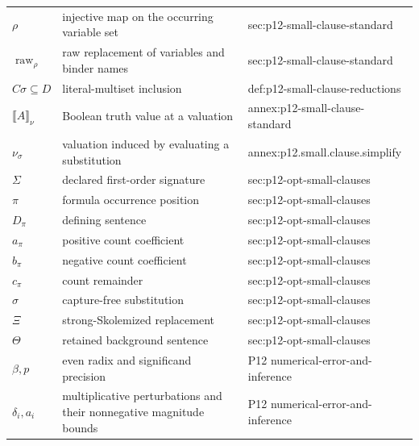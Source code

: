 \begin{longtable}{@{}p{}p{}p{}@{}}
\(\rho\) & injective map on the occurring variable set & sec:\allowbreak{}p12-\allowbreak{}small-\allowbreak{}clause-\allowbreak{}standard \\
\(\operatorname{raw}_\rho\) & raw replacement of variables and binder names & sec:\allowbreak{}p12-\allowbreak{}small-\allowbreak{}clause-\allowbreak{}standard \\
\(C\sigma\subseteq D\) & literal-multiset inclusion & def:\allowbreak{}p12-\allowbreak{}small-\allowbreak{}clause-\allowbreak{}reductions \\
\(\llbracket A\rrbracket_\nu\) & Boolean truth value at a valuation & annex:\allowbreak{}p12-\allowbreak{}small-\allowbreak{}clause-\allowbreak{}standard \\
\(\nu_\sigma\) & valuation induced by evaluating a substitution & annex:\allowbreak{}p12.\allowbreak{}small.\allowbreak{}clause.\allowbreak{}simplify \\
\(\Sigma\) & declared first-order signature & sec:\allowbreak{}p12-\allowbreak{}opt-\allowbreak{}small-\allowbreak{}clauses \\
\(\pi\) & formula occurrence position & sec:\allowbreak{}p12-\allowbreak{}opt-\allowbreak{}small-\allowbreak{}clauses \\
\(D_\pi\) & defining sentence & sec:\allowbreak{}p12-\allowbreak{}opt-\allowbreak{}small-\allowbreak{}clauses \\
\(a_\pi\) & positive count coefficient & sec:\allowbreak{}p12-\allowbreak{}opt-\allowbreak{}small-\allowbreak{}clauses \\
\(b_\pi\) & negative count coefficient & sec:\allowbreak{}p12-\allowbreak{}opt-\allowbreak{}small-\allowbreak{}clauses \\
\(c_\pi\) & count remainder & sec:\allowbreak{}p12-\allowbreak{}opt-\allowbreak{}small-\allowbreak{}clauses \\
\(\sigma\) & capture-free substitution & sec:\allowbreak{}p12-\allowbreak{}opt-\allowbreak{}small-\allowbreak{}clauses \\
\(\Xi\) & strong-Skolemized replacement & sec:\allowbreak{}p12-\allowbreak{}opt-\allowbreak{}small-\allowbreak{}clauses \\
\(\Theta\) & retained background sentence & sec:\allowbreak{}p12-\allowbreak{}opt-\allowbreak{}small-\allowbreak{}clauses \\
\(\beta,\allowbreak p\) & even radix and significand precision & P12 numerical-\allowbreak{}error-\allowbreak{}and-\allowbreak{}inference \\
\(\delta_i,\allowbreak a_i\) & multiplicative perturbations and their nonnegative magnitude bounds & P12 numerical-\allowbreak{}error-\allowbreak{}and-\allowbreak{}inference \\

\end{longtable}
